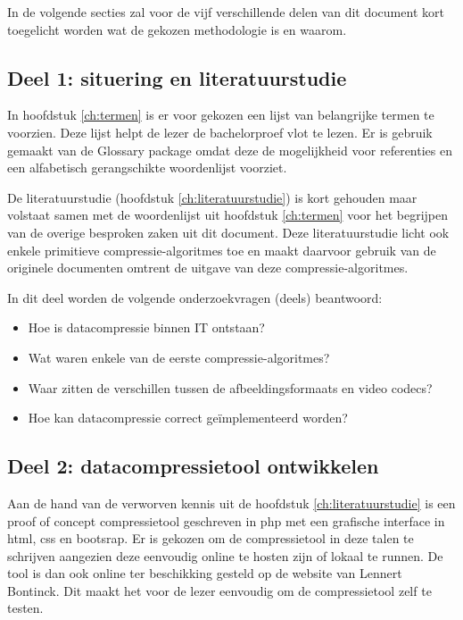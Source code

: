 In de volgende secties zal voor de vijf verschillende delen van dit document kort toegelicht worden wat de gekozen methodologie is en waarom.

\subsection{Deel 1: situering en literatuurstudie}
\label{sec:aanpak-bachelorproef-deel-1}

In hoofdstuk \ref{ch:termen} is er voor gekozen een lijst van belangrijke termen te voorzien. Deze lijst helpt de lezer de bachelorproef vlot te lezen. Er is gebruik gemaakt van de Glossary package omdat deze de mogelijkheid voor referenties en een alfabetisch gerangschikte woordenlijst voorziet.

De literatuurstudie (hoofdstuk \ref{ch:literatuurstudie}) is kort gehouden maar volstaat samen met de woordenlijst uit hoofdstuk \ref{ch:termen} voor het begrijpen van de overige besproken zaken uit dit document. Deze literatuurstudie licht ook enkele primitieve \glspl{compressie-algoritme} toe en maakt daarvoor gebruik van de originele documenten omtrent de uitgave van deze \glspl{compressie-algoritme}. 

In dit deel worden de volgende onderzoekvragen (deels) beantwoord: 
\begin{itemize}
	\item Hoe is \gls{datacompressie} binnen IT ontstaan?
	\item Wat waren enkele van de eerste \glspl{compressie-algoritme}?
	\item Waar zitten de verschillen tussen de \glspl{afbeeldingsformaat} en video \glspl{codec}?
	\item Hoe kan \gls{datacompressie} correct geïmplementeerd worden?
\end{itemize}

\subsection{Deel 2: datacompressietool ontwikkelen}
\label{sec:aanpak-bachelorproef-deel-2}

Aan de hand van de verworven kennis uit de hoofdstuk \ref{ch:literatuurstudie} is een proof of concept \gls{compressietool} geschreven in \gls{php} met een grafische interface in \gls{html}, \gls{css} en \gls{bootsrap}. Er is gekozen om de \gls{compressietool} in deze talen te schrijven aangezien deze eenvoudig online te hosten zijn of lokaal te runnen. De tool is dan ook online ter beschikking gesteld op de website van Lennert Bontinck. Dit maakt het voor de lezer eenvoudig om de \gls{compressietool} zelf te testen.

